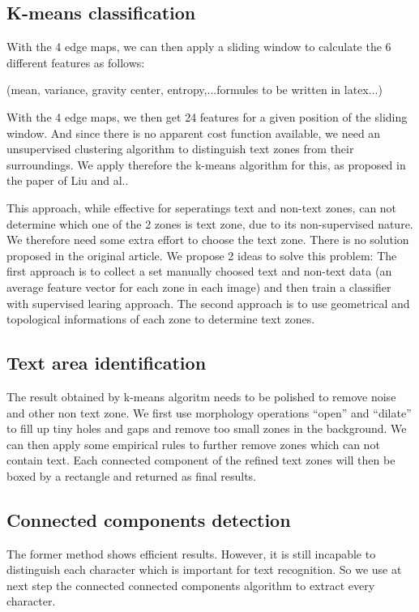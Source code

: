 \documentclass[paper=a4, french, 11pt]{scrartcl}
\begin{document}
\subsection{K-means classification}
With the 4 edge maps, we can then apply a sliding window to calculate the 6 different features as follows:

(mean, variance, gravity center, entropy,...formules to be written in latex...)

With the 4 edge maps, we then get 24 features for a given position of the sliding window. And since there is no apparent cost function available, we need an unsupervised clustering algorithm to distinguish text zones from their surroundings. We apply therefore the k-means algorithm for this, as proposed in the paper of Liu and al..

This approach, while effective for seperatings text and non-text zones, can not determine which one of the 2 zones is text zone, due to its non-supervised nature. We therefore need some extra effort to choose the text zone. There is no solution proposed in the original article. We propose 2 ideas to solve this problem: The first approach is to collect a set manually choosed text and non-text data (an average feature vector for each zone in each image) and then train a classifier with supervised learing approach. The second approach is to use geometrical and topological informations of each zone to determine text zones.

\subsection{Text area identification}
The result obtained by k-means algoritm needs to be polished to remove noise and other non text zone. We first use morphology operations “open” and “dilate” to fill up tiny holes and gaps and remove too small zones in the background. We can then apply some empirical rules to further remove zones which can not contain text. Each connected component of the refined text zones will then be boxed by a rectangle and returned as final results.
\subsection{Connected components detection}
The former method shows efficient results. However, it is still incapable to distinguish each character which is important for text recognition. So we use at next step the connected connected components algorithm to extract every character.
\end{document}

